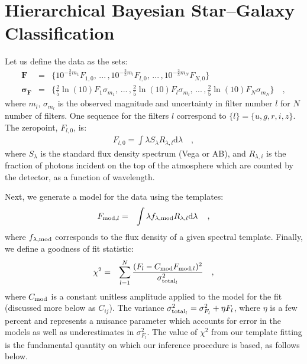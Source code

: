 \documentclass[12pt,preprint]{aastex}
\newcommand{\datavector}[1]{\boldsymbol{#1}}
\newcommand{\flux}{\datavector{F}}
\newcommand{\uncertainty}{\datavector{\sigma_F}}
\newcommand{\dd}{\mathrm{d}}
\begin{document}
\clearpage





\appendix
\section{Hierarchical Bayesian Star--Galaxy Classification}

Let us define the data as the sets:
\footnotesize
\begin{eqnarray}\displaystyle
\flux & = & \{10^{-\frac{2}{5}m_1}F_{1,0},\,...\,,10^{-\frac{2}{5}m_l}F_{l,0},\,...\,,10^{-\frac{2}{5}m_N}F_{N,0}\}
\nonumber\\
\uncertainty & = & \{\frac{2}{5}\ln(10)F_1\sigma_{m_1},\,...\,,\frac{2}{5}\ln(10)F_l\sigma_{m_l},\,...\,,\frac{2}{5}\ln(10)F_N\sigma_{m_N}\}
\quad ,
\end{eqnarray}
\normalsize
\noindent where $m_l$, $\sigma_{m_l}$ is the observed magnitude and 
uncertainty in filter number $l$ for $N$ number of filters.  One  
sequence for the filters $l$ correspond to $\{l\}=\{u,g,r,i,z\}$. The 
zeropoint, $F_{l,0}$, is:
\begin{eqnarray}\displaystyle
F_{l,0}=\int \lambda S_\lambda R_{\lambda, l} \dd \lambda
\quad ,
\end{eqnarray}
where $S_\lambda$ is the standard flux density spectrum (Vega or AB), and 
$R_{\lambda,i}$ is the fraction of photons incident on the top 
of the atmosphere which are counted by the detector, as a function 
of wavelength.

Next, we generate a model for the data using the templates:
\begin{eqnarray}\displaystyle
F_{{\rm mod},l} & = & \int  \lambda f_{\lambda,{\rm mod}} R_{\lambda,l} {\rm d}\lambda\,
\quad ,
\end{eqnarray}
where $f_{\lambda,{\rm mod}}$ corresponds to the flux density 
of a given spectral template.  Finally, we define a goodness of 
fit statistic:
\begin{eqnarray}\displaystyle\label{eqn:chi}
\chi^2 & = & \sum\limits_{l=1}^N \frac{(F_l-C_{\rm mod}F_{{\rm mod},l})^2}{\sigma_{{\rm total}_l}^2}
\quad ,
\end{eqnarray}
where $C_{\rm mod}$ is a constant unitless amplitude applied to the 
model for the fit (discussed more below as $C_{ij}$).  The variance 
$\sigma_{{\rm total}_l}^2 = \sigma_{F_l}^2 + \eta F_{l}$, where $\eta$ is 
a few percent and represents a nuisance parameter which accounts for 
error in the models as well as underestimates in $ \sigma_{F_l}^2 $.  The 
value of $\chi^2$ from our template fitting is the fundamental quantity 
on which our inference procedure is based, as follows below.
\end{document}
